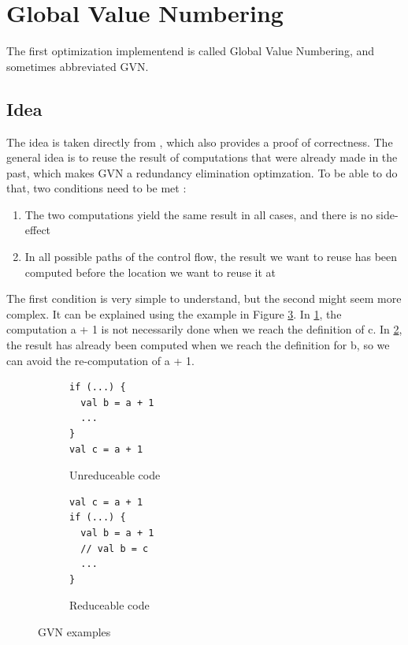 \documentclass[12pt,a4paper]{article}
\newcommand{\scala}[1]{\textsf{#1}}
\begin{document}
\section{Global Value Numbering}

The first optimization implementend is called Global Value Numbering, and sometimes abbreviated GVN.

\subsection{Idea}

The idea is taken directly from \cite{ssabook}, which also provides a proof of correctness. The general idea is to reuse the result of computations that were already made in the past, which makes GVN a redundancy elimination optimzation. To be able to do that, two conditions need to be met :

\begin{enumerate}
\item The two computations yield the same result in all cases, and there is no side-effect
\item In all possible paths of the control flow, the result we want to reuse has been computed before the location we want to reuse it at
\end{enumerate}

The first condition is very simple to understand, but the second might seem more complex. It can be explained using the example in Figure \ref{fig:gvn}. In \ref{fig:gvn1}, the computation \scala{a + 1} is not necessarily done when we reach the definition of \scala{c}. In \ref{fig:gvn2}, the result has already been computed when we reach the definition for \scala{b}, so we can avoid the re-computation of \scala{a + 1}.

\begin{figure}
	\begin{subfigure}{0.5\textwidth}
		\begin{lstlisting}[style=scalasnp]
if (...) {
  val b = a + 1
  ...
}
val c = a + 1
		\end{lstlisting}
		\caption{Unreduceable code}
		\label{fig:gvn1}
	\end{subfigure}
	\quad
	\begin{subfigure}{0.5\textwidth}
		\begin{lstlisting}[style=scalasnp]
val c = a + 1
if (...) {
  val b = a + 1
  // val b = c
  ...
}
		\end{lstlisting}
		\caption{Reduceable code}
		\label{fig:gvn2}
	\end{subfigure}
	\caption{GVN examples}
	\label{fig:gvn}
\end{figure}
\end{document}
